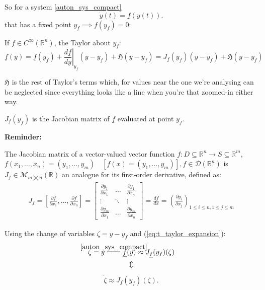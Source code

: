 So for a system \ref{auton_sys_compact}
\[
\dot{y}(t) = \underline{f}(y(t)).
\] that has a fixed point $y_f \implies \underline{f}(y_f) = 0$:

If $f \in C^\infty(\mathbb{R}^n) $, the Taylor about $y_f$:
\begin{equation}\label{eq:t_taylor_expansion}
\underline{f}(y) = \underline{f}(y_f) + \left. \frac{d \underline{f}}{dy} \right|_{y_f}(y - y_f) + \mathfrak{H}(y - y_f) = J_{\underline{f}}(y_f)(y - y_f) + \mathfrak{H}(y - y_f) \tag{Taylor}
\end{equation}

$\mathfrak{H}$ is the rest of Taylor's terms which, for values near the one we're analysing can be neglected since everything looks like a line when you're that zoomed-in either way.

$J_{\underline{f}}(y_f)$ is the Jacobian matrix of $\underline{f}$ evaluated at point $y_f$.

\textbf{Reminder:}
\begin{definition}
The Jacobian matrix of a vector-valued vector function $f : D \subseteq \mathbb{R}^n \rightarrow S \subseteq \mathbb{R}^m$, $f(x_1, \dots, x_n) = (y_1, \dots , y_m) \quad [f(x) = (y_1, \dots , y_m)], f \in \mathcal{D}(\mathbb{R}^n)$ is $J_f \in \mathcal{M}_{m \bigtimes n}(\mathbb{R})$ an analogue for its first-order derivative, defined as:
\begin{align*}
	J_f = \left[ \frac{\partial f}{\partial x_1}, \dots , \frac{\partial f}{\partial x_n}  \right] =
	\begin{bmatrix*}
		\frac{\partial y_1}{\partial x_1} & \dots & \frac{\partial y_1}{\partial x_n} \\
		\vdots & \ddots & \vdots \\
		\frac{\partial y_m}{\partial x_1} & \dots &  \frac{\partial y_m}{\partial x_n}
	\end{bmatrix*} =
	\frac{df}{dx} =
	\left(   \frac{\partial y_i}{\partial x_j} \right)_{1 \leqslant i \leqslant n, 1 \leqslant j \leqslant m}
\end{align*}
\end{definition}

\newcommand\eqCuzOfSys{\stackrel{\mathclap{\normalfont\mbox{\ref{auton_sys_compact}}}}{=\joinrel=\joinrel=}}

Using the change of variables $\zeta = y - y_f$ and (\ref{eq:t_taylor_expansion}):
\begin{gather*}
\dot{\zeta} = \dot{y} \eqCuzOfSys \underline{f}(y) \approx J_{\underline{f}}(y_f)(\zeta) \\
\Updownarrow
\end{gather*}
\vspace*{-16mm}
\begin{gather}\label{eq:lin_approx}
\dot{\zeta} \approx J_{\underline{f}}(y_f)(\zeta). \tag{Lin. Approx.}
\end{gather}

